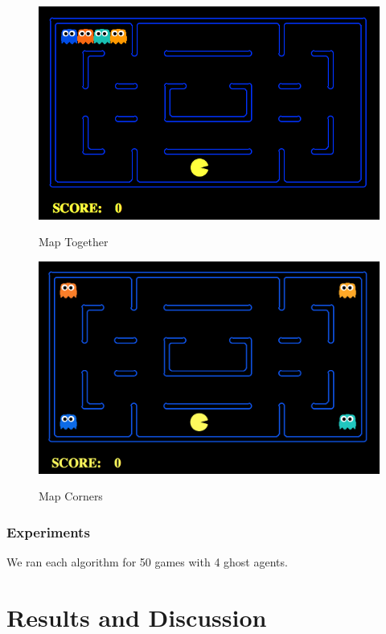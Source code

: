 \documentclass[11pt]{article}
\begin{document}
\begin{multicols}{2}
\begin{figure}
	\includegraphics[width=\columnwidth]{maptogether.png}\\
	\caption{Map Together}
	\label{fig:maptogether}
\end{figure}

\begin{figure}
	\includegraphics[width=\columnwidth]{mapcorners.png}\\
	\caption{Map Corners}
	\label{fig:mapcorners}
\end{figure}


\subsubsection{Experiments}
We ran each algorithm for 50 games with 4 ghost agents.  

\section{Results and Discussion}


\end{multicols}
\end{document}
